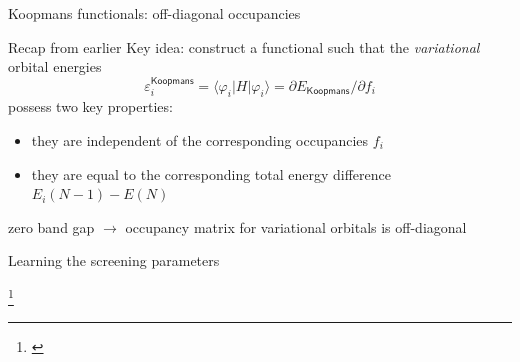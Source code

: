 \documentclass[xcolor=table,aspectratio=169]{beamer}
\newcommand\blfootcite[1]{%
  \begingroup
  \renewcommand\thefootnote{}\footnote{\hspace{-4ex}\cite{#1}}%
  \addtocounter{footnote}{-1}%
  \endgroup
}
\newcommand{\braopket}[3]{\langle #1|#2|#3\rangle}
\numberwithin{equation}{section}
\begin{document}
\begin{frame}{Koopmans functionals: off-diagonal occupancies}
   \begin{block}{Recap from earlier}
      Key idea: construct a functional such that the \emph{variational} orbital energies
      \begin{equation*}
         \varepsilon^\mathsf{Koopmans}_i = \braopket{\varphi_i}{H}{\varphi_i} = \partial E_\mathsf{Koopmans}/\partial f_i
      \end{equation*}
      possess two key properties:
      \begin{itemize}
         \item they are independent of the corresponding occupancies $f_i$
         \item they are equal to the corresponding total energy difference $E_i(N-1) - E(N)$
      \end{itemize}
   \end{block}

   zero band gap $\rightarrow$ occupancy matrix for variational orbitals is off-diagonal
\end{frame}

\begin{frame}{Learning the screening parameters}
   \begin{center}
   \end{center}

   \vspace{-2em}

   \blfootcite{Schubert2022}

\end{frame}
\end{document}

